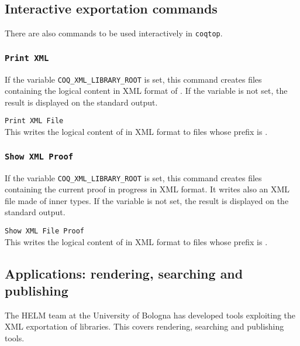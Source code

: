 \subsection{Interactive exportation commands}

There are also commands to be used interactively in {\tt coqtop}.

\subsubsection[\tt Print XML {\qualid}]{\tt Print XML {\qualid}}

If the variable {\tt COQ\_XML\_LIBRARY\_ROOT} is set, this command creates
files containing the logical content in XML format of {\qualid}. If
the variable is not set, the result is displayed on the standard
output.

\begin{Variants}
\item {\tt Print XML File {\str} {\qualid}}\\
This writes the logical content of {\qualid} in XML format to files
whose prefix is {\str}.
\end{Variants}

\subsubsection[{\tt Show XML Proof}]{{\tt Show XML Proof}}

If the variable {\tt COQ\_XML\_LIBRARY\_ROOT} is set, this command creates
files containing the current proof in progress in XML format. It
writes also an XML file made of inner types.  If the variable is not
set, the result is displayed on the standard output.

\begin{Variants}
\item {\tt Show XML File {\str} Proof}\\ This writes the
logical content of {\qualid} in XML format to files whose prefix is
{\str}. 
\end{Variants}

\subsection{Applications: rendering, searching and publishing}

The HELM team at the University of Bologna has developed tools
exploiting the XML exportation of {\Coq} libraries. This covers
rendering, searching and publishing tools.

